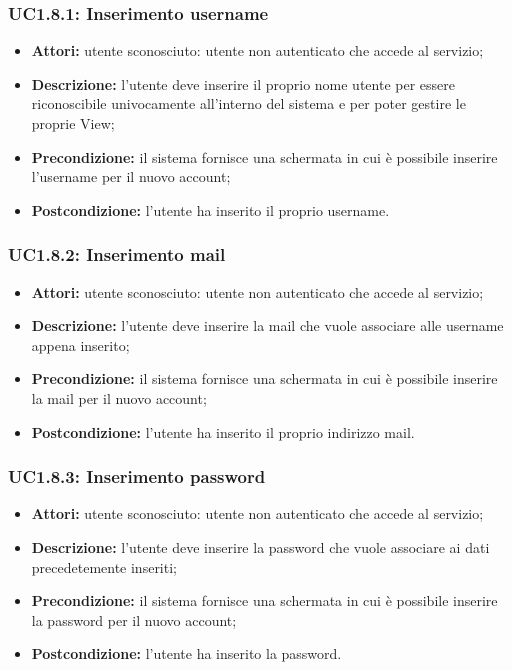 \subsubsection{UC1.8.1: Inserimento username}

\begin{itemize}
   	\item \textbf{Attori:} utente sconosciuto: utente non autenticato che accede al servizio;
    \item \textbf{Descrizione:} l'utente deve inserire il proprio nome utente per essere riconoscibile univocamente all'interno del sistema e per poter gestire le proprie View\gloss{};
    \item \textbf{Precondizione:} il sistema fornisce una schermata in cui è possibile inserire l'username per il nuovo account;
    \item \textbf{Postcondizione:} l'utente ha inserito il proprio username.
\end{itemize}

\subsubsection{UC1.8.2: Inserimento mail}

\begin{itemize}
   	\item \textbf{Attori:} utente sconosciuto: utente non autenticato che accede al servizio;
    \item \textbf{Descrizione:} l'utente deve inserire la mail che vuole associare alle username appena inserito;
    \item \textbf{Precondizione:} il sistema fornisce una schermata in cui è possibile inserire la mail per il nuovo account;
    \item \textbf{Postcondizione:} l'utente ha inserito il proprio indirizzo mail.
\end{itemize}

\subsubsection{UC1.8.3: Inserimento password}

\begin{itemize}
   	\item \textbf{Attori:} utente sconosciuto: utente non autenticato che accede al servizio;
    \item \textbf{Descrizione:} l'utente deve inserire la password che vuole associare ai dati precedetemente inseriti;
    \item \textbf{Precondizione:} il sistema fornisce una schermata in cui è possibile inserire la password per il nuovo account;
    \item \textbf{Postcondizione:} l'utente ha inserito la password.
\end{itemize}

